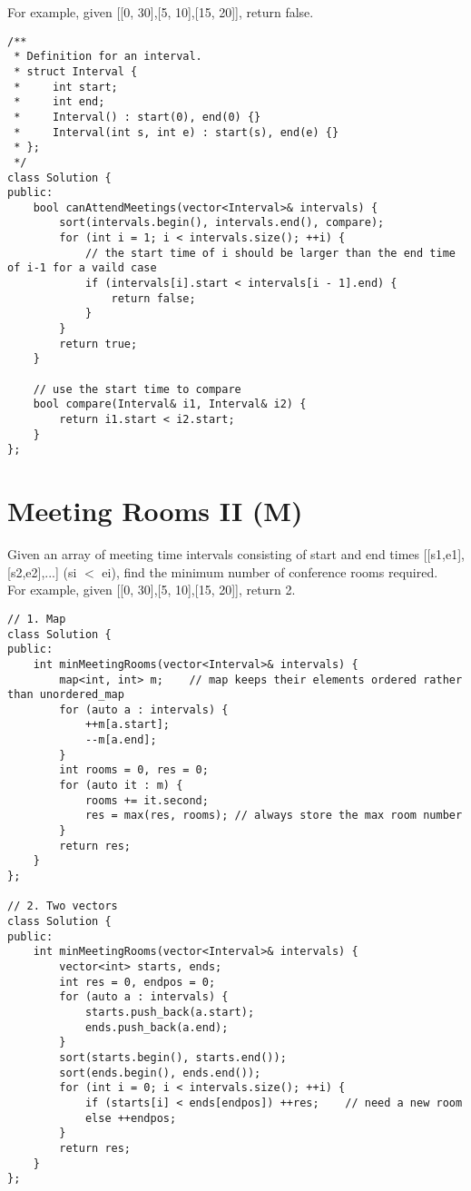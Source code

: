For example, given [[0, 30],[5, 10],[15, 20]], return false.\\

\begin{lstlisting}
/** 
 * Definition for an interval. 
 * struct Interval { 
 *     int start; 
 *     int end; 
 *     Interval() : start(0), end(0) {} 
 *     Interval(int s, int e) : start(s), end(e) {} 
 * }; 
 */
class Solution {
public:
    bool canAttendMeetings(vector<Interval>& intervals) {
        sort(intervals.begin(), intervals.end(), compare);
        for (int i = 1; i < intervals.size(); ++i) {
            // the start time of i should be larger than the end time of i-1 for a vaild case
            if (intervals[i].start < intervals[i - 1].end) {
                return false;
            }
        }
        return true;
    }
    
    // use the start time to compare
    bool compare(Interval& i1, Interval& i2) {
        return i1.start < i2.start;
    }
};
\end{lstlisting}


\section{Meeting Rooms II (M)}
Given an array of meeting time intervals consisting of start and end times [[s1,e1],[s2,e2],...] (si $<$ ei), find the minimum number of conference rooms required.\\

For example, given [[0, 30],[5, 10],[15, 20]], return 2.\\

\begin{lstlisting}
// 1. Map
class Solution {
public:
    int minMeetingRooms(vector<Interval>& intervals) {
        map<int, int> m;    // map keeps their elements ordered rather than unordered_map
        for (auto a : intervals) {
            ++m[a.start];
            --m[a.end];
        }
        int rooms = 0, res = 0;
        for (auto it : m) {
            rooms += it.second;
            res = max(res, rooms); // always store the max room number
        }
        return res;
    }
};

// 2. Two vectors
class Solution {
public:
    int minMeetingRooms(vector<Interval>& intervals) {
        vector<int> starts, ends;
        int res = 0, endpos = 0;
        for (auto a : intervals) {
            starts.push_back(a.start);
            ends.push_back(a.end);
        }
        sort(starts.begin(), starts.end());
        sort(ends.begin(), ends.end());
        for (int i = 0; i < intervals.size(); ++i) {
            if (starts[i] < ends[endpos]) ++res;    // need a new room
            else ++endpos;
        }
        return res;
    }
};
\end{lstlisting}


